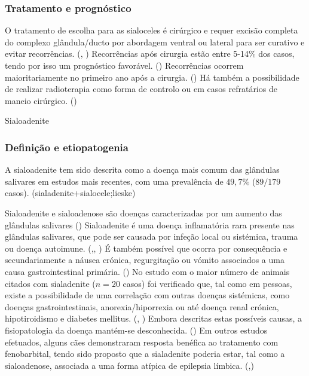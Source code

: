 \subsubsection{Tratamento e prognóstico}

O tratamento de escolha para as sialoceles é cirúrgico e requer excisão completa do complexo glândula/ducto por abordagem ventral ou lateral para ser curativo e evitar recorrências. (\cite{Poirier2018}, \cite{Swieton2022}) Recorrências após cirurgia estão entre 5-14\% dos casos, tendo por isso um prognóstico favorável. (\cite{Poirier2018}) Recorrências ocorrem maioritariamente no primeiro ano após a cirurgia. (\cite{Swieton2022}) Há também a possibilidade de realizar radioterapia como forma de controlo ou em casos refratários de maneio cirúrgico. (\cite{Poirier2018})

Sialoadenite
\subsubsection{Definição e etiopatogenia}
A sialoadenite tem sido descrita como a doença mais comum das glândulas salivares em estudos mais recentes, com uma prevalência de $49,7\%$  ($89/179$ casos). (sialadenite+sialocele;lieske)

Sialoadenite e sialoadenose são doenças caracterizadas por um aumento das glândulas salivares (\cite{Enache2025}) Sialoadenite é uma doença inflamatória rara presente nas glândulas salivares, que pode ser causada por infeção local ou sistémica, trauma ou doença autoimune. (\cite{supurativa},\cite{11cases}, \cite{sialadenite}) É também possível que ocorra por consequência e secundariamente a náusea crónica, regurgitação ou vómito associados a uma causa gastrointestinal primária. (\cite{McGill2009}) No estudo com o maior número de animais citados \cite{Kumar2017} com sialadenite ($n=20$ casos) foi verificado que, tal como em pessoas, existe a possibilidade de uma correlação com outras doenças sistémicas, como doenças gastrointestinais, anorexia/hiporrexia ou até doença renal crónica, hipotiroidismo e diabetes mellitus. (\cite{11cases}, \cite{Enache2025}) Embora descritas estas possíveis causas, a fisiopatologia da doença mantém-se desconhecida. (\cite{sialadenite}) Em outros estudos  efetuados, alguns cães demonstraram resposta benéfica ao tratamento com fenobarbital, tendo sido proposto que a sialadenite   poderia estar, tal como a sialoadenose, associada a uma forma atípica de epilepsia límbica. (\cite{Martinez2018},\cite{Park2022}) 

